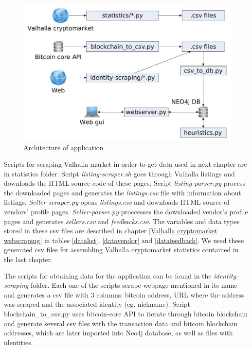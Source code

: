 \documentclass[
  digital, %
  table,   %
  lof,     %
  lot,     %
  oneside
]{fithesis3}
\begin{document}
\begin{figure}[!htb]
    \centering
    \includegraphics[width=1\textwidth]{application_architecture}
    \caption{Architecture of application}
    \label{application_architecture}
\end{figure}

Scripts for scraping Valhalla market in order to get data used in next chapter are in statistics folder.
Script \emph{listing-scraper.sh} goes through Valhalla listings and downloads the HTML source code of these pages.
Script \emph{listing-parser.py} process the downloaded pages and generates the \emph{listings.csv} file with information about listings.
\emph{Seller-scraper.py} opens \emph{listings.csv} and downloads HTML source of vendors' profile pages. 
\emph{Seller-parser.py} proccesses the downloaded vendor's profile pages and generates \emph{sellers.csv} and \emph{feedbacks.csv}.
The variables and data types stored in these csv files are described in chapter \ref{Valhalla cryptomarket webscraping}
in tables \ref{datalist}, \ref{datavendor} and \ref{datafeedback}. We used these generated csv files for
assembling Valhalla cryptomarket statistics contained in the last chapter.

The scripts for obtaining data for the application can be found in the \emph{identity--scraping} folder.
Each one of the scripts scrape webpage mentioned
in its name and generates a csv file with 3 columns:
bitcoin address, URL where the address was scraped and the associated identity (eg. nickname).
Script blockchain\_to\_csv.py uses bitcoin-core API to iterate through bitcoin blockchain 
and generate several csv files with the transaction data and bitcoin blockchain addresses, which are later imported into Neo4j database, as well as 
files with identities.
\end{document}
